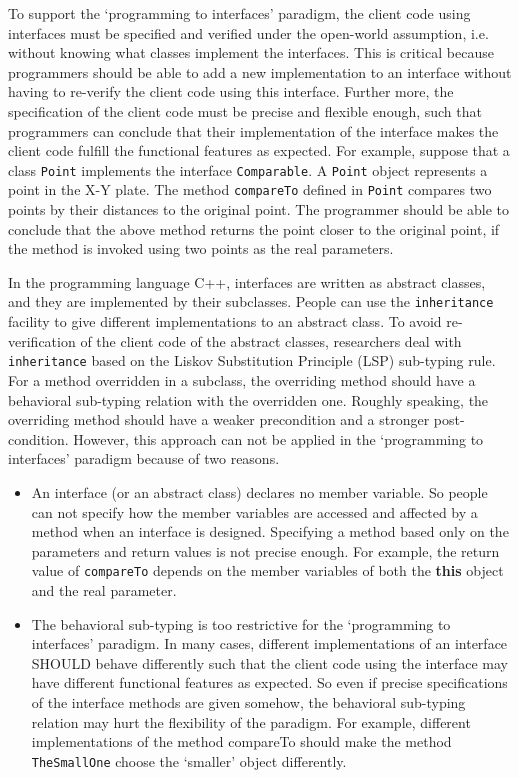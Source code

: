 \documentclass[fleqn]{llncs}
\begin{document}
To support the `programming to interfaces' paradigm, the client code using interfaces must be specified and verified under the open-world assumption, i.e. without knowing what classes implement the interfaces. This is critical because
programmers should be able to add a new implementation to an interface without having to re-verify the client code using this interface. Further more, the specification of the client code must be precise and flexible enough, such that programmers can conclude that their implementation of the interface
makes the client code fulfill the functional features as expected.
For example, suppose that a class \texttt{Point} implements the interface \texttt{Comparable}. A \texttt{Point} object represents a point in the X-Y plate.  The method \texttt{compareTo} defined in \texttt{Point} compares two points by their distances to the original point. The programmer should be able to conclude that the above method returns the point closer to the original point, if the method is invoked using two points as the real parameters.

In the programming language C++, interfaces are written as abstract classes, and they are implemented by
their subclasses. People can use the \texttt{inheritance} facility to give different implementations to an abstract class. To avoid re-verification of the client code of the abstract classes, researchers deal with \texttt{inheritance} based on the Liskov Substitution Principle (LSP) sub-typing rule\cite{Liskov:1994:BNS:197320.197383}. For a method overridden in a subclass, the overriding method should have a behavioral sub-typing relation with the overridden one. Roughly speaking, the overriding method should have a weaker precondition and a stronger post-condition. However, this approach can not be applied in the `programming to interfaces' paradigm because of two reasons.
\begin{itemize}
\item An interface (or an abstract class) declares no member variable. So people can not specify how the member variables are accessed and affected by a method when an interface is designed. Specifying a method based only on the parameters and return values is not precise enough. For example, the return value of \texttt{compareTo} depends on the member variables of both the \textbf{this} object and the real parameter.
\item The behavioral sub-typing is too restrictive for the `programming to interfaces' paradigm. In many cases, different implementations of an interface SHOULD behave differently such that the client code using the interface may have different functional features as expected. So even if precise specifications of the interface methods are given somehow, the behavioral sub-typing relation may hurt the flexibility of the paradigm. For example, different implementations of the method compareTo should make the method \texttt{TheSmallOne} choose the `smaller' object differently.
\end{itemize}
\end{document}
